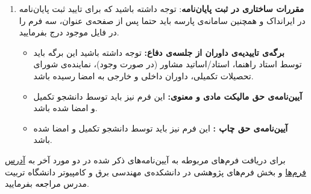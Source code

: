 \begin{enumerate}
\item \textbf{مقررات ساختاری در ثبت پایان‌نامه}:
توجه داشته باشید که برای تایید ثبت پایان‌نامه در ایرانداک و همچنین سامانه‌ی پارسه باید حتما پس از صفحه‌ی عنوان، سه فرم را در فایل موجود درج بفرمایید. 
\begin{itemize}
	\item \textbf{برگه‌ی تاییدیه‌ی داوران از جلسه‌ی دفاع:}
توجه داشته باشید این برگه باید توسط استاد راهنما، استاد/اساتید مشاور (در صورت وجود)، نماینده‌ی شورای تحصیلات تکمیلی، داوران داخلی و خارجی به امضا رسیده باشد. 

\item \textbf{آیین‌نامه‌ی حق مالیکت مادی و معنوی:}
		این فرم نیز باید توسط دانشجو تکمیل و امضا شده باشد. 

\item \textbf{آیین‌نامه‌ی حق چاپ :}
		این فرم نیز باید توسط دانشجو تکمیل و امضا شده باشد. 
\end{itemize}
\end{enumerate}	

\noindent
برای دریافت فرم‌های مربوطه به آیین‌نامه‌های ذکر شده در دو مورد آخر به 
\href{https://www.modares.ac.ir/ece/forms}{آدرس فرم‌ها} 
و بخش فرم‌های پژوهشی در دانشکده‌ی مهندسی برق و کامپیوتر دانشگاه تربیت مدرس مراجعه بفرمایید. 
